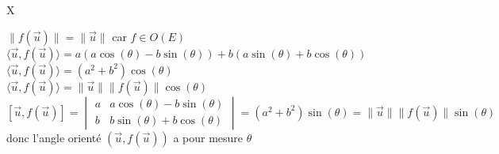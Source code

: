 X\documentclass{article}
\begin{document}
$\| f(\vec u) \|= \| \vec u \|$ car $f \in O(E)$ \\
$\langle \vec u,f(\vec u) \rangle= a(a\cos(\theta)-b\sin(\theta))+ b(a\sin(\theta)+b\cos(\theta))$ \\
$\langle \vec u,f(\vec u) \rangle= (a^2 +b^2) \cos(\theta)$ \\
$\langle \vec u,f(\vec u) \rangle= \|\vec u \| \| f(\vec u) \| \cos(\theta)$ \\
$[\vec u, f(\vec u)]= \begin{vmatrix}
a & a\cos(\theta)-b\sin(\theta) \\
b & b\sin(\theta)+ b \cos(\theta)
\end{vmatrix}=(a^2+b^2)\sin(\theta)= \|\vec u \| \| f(\vec u) \| \sin(\theta)$ \\
donc l'angle orienté $(\vec u, f(\vec u))$ a pour mesure $\theta$
\end{document}

